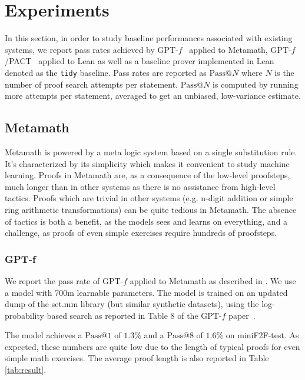 \section{Experiments}

In this section, in order to study baseline performances associated with existing systems, we report pass rates achieved by GPT-$f$~\citep{polu2020generative} applied to Metamath, GPT-$f$/PACT~\citep{polu2020generative,han2021proof} applied to Lean as well as a baseline prover implemented in Lean denoted as the \texttt{tidy} baseline. Pass rates are reported as $\text{Pass}@N$ where $N$ is the number of proof search attempts per statement. $\text{Pass}@N$ is computed by running more attempts per statement, averaged to get an unbiased, low-variance estimate.

\subsection{Metamath}

Metamath is powered by a meta logic system based on a single substitution rule. It's characterized by its simplicity which makes it convenient to study machine learning. Proofs in Metamath are, as a consequence of the low-level proofsteps, much longer than in other systems as there is no assistance from high-level tactics. Proofs which are trivial in other systems (e.g. n-digit addition or simple ring arithmetic transformations) can be quite tedious in Metamath. The absence of tactics is both a benefit, as the models sees and learns on everything, and a challenge, as proofs of even simple exercises require hundreds of proofsteps.

\subsubsection{GPT-f}

We report the pass rate of GPT-$f$ applied to Metamath as described in \citet{polu2020generative}. We use a model with 700m learnable parameters. The model is trained on an updated dump of the set.mm library (but similar synthetic datasets), using the log-probability based search as reported in Table 8 of the GPT-$f$ paper~\citep{polu2020generative}.

The model achieves a $\text{Pass}@1$ of $1.3\%$ and a $\text{Pass}@8$ of $1.6\%$ on \textsf{miniF2F}-test. As expected, these numbers are quite low due to the length of typical proofs for even simple math exercises. The average proof length is also reported in Table \ref{tab:result}.

